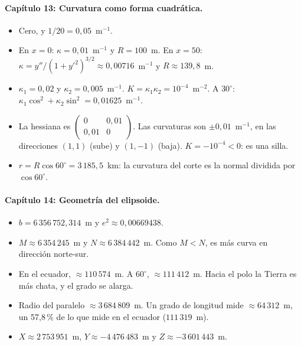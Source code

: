 \paragraph{Capítulo 13: Curvatura como forma cuadrática.}
\begin{itemize}
  \item[\ref{pb:13-1}] Cero, y \(1/20=0{,}05\)~m\(^{-1}\).
  \item[\ref{pb:13-2}] En \(x=0\): \(\kappa=0{,}01\)~m\(^{-1}\) y \(R=100\)~m. En \(x=50\): \(\kappa=y''/(1+y'^2)^{3/2}\approx0{,}00716\)~m\(^{-1}\) y \(R\approx139{,}8\)~m.
  \item[\ref{pb:13-3}] \(\kappa_1=0{,}02\) y \(\kappa_2=0{,}005\)~m\(^{-1}\). \(K=\kappa_1\kappa_2=10^{-4}\)~m\(^{-2}\). A \(30^\circ\): \(\kappa_1\cos^2+\kappa_2\sin^2=0{,}01625\)~m\(^{-1}\).
  \item[\ref{pb:13-4}] La hessiana es \(\begin{pmatrix}0&0{,}01\\0{,}01&0\end{pmatrix}\). Las curvaturas son \(\pm0{,}01\)~m\(^{-1}\), en las direcciones \((1,1)\) (sube) y \((1,-1)\) (baja). \(K=-10^{-4}<0\): es una silla.
  \item[\ref{pb:13-5}] \(r=R\cos60^\circ=3\,185{,}5\)~km: la curvatura del corte es la normal dividida por \(\cos60^\circ\).
\end{itemize}

\paragraph{Capítulo 14: Geometría del elipsoide.}
\begin{itemize}
  \item[\ref{pb:14-1}] \(b=6\,356\,752{,}314\)~m y \(e^2\approx0{,}00669438\).
  \item[\ref{pb:14-2}] \(M\approx6\,354\,245\)~m y \(N\approx6\,384\,442\)~m. Como \(M<N\), es más curva en dirección norte-sur.
  \item[\ref{pb:14-3}] En el ecuador, \(\approx110\,574\)~m. A \(60^\circ\), \(\approx111\,412\)~m. Hacia el polo la Tierra es más chata, y el grado se alarga.
  \item[\ref{pb:14-4}] Radio del paralelo \(\approx3\,684\,809\)~m. Un grado de longitud mide \(\approx64\,312\)~m, un 57{,}8\,\% de lo que mide en el ecuador (\(111\,319\)~m).
  \item[\ref{pb:14-5}] \(X\approx2\,753\,951\)~m, \(Y\approx-4\,476\,483\)~m y \(Z\approx-3\,601\,443\)~m.
\end{itemize}

